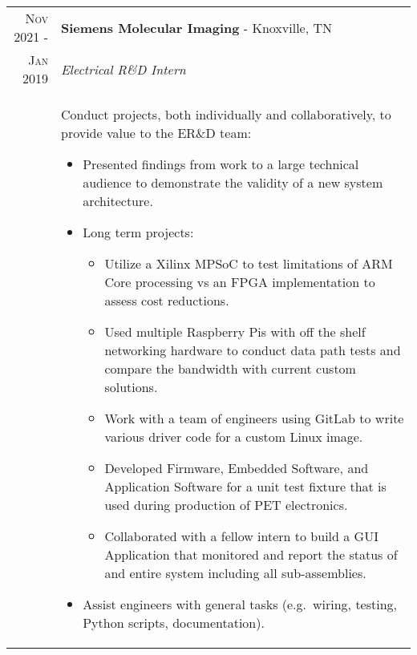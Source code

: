 \documentclass[a4paper,12pt]{article}
\begin{document}
%
%
\begin{tabularx}{\textwidth}{r|X}
   \textsc{Nov 2021 \--} & \textbf{Siemens Molecular Imaging} \-- Knoxville, TN\\
   \textsc{Jan 2019} & \emph{Electrical R\&D Intern}\\
   & \small{Conduct projects, both individually and collaboratively, to provide value to the ER\&D team:
      \begin{itemize}[leftmargin=20pt,topsep=1pt,itemsep=1pt,partopsep=0pt, parsep=1pt]
         \item Presented findings from work to a large technical audience to demonstrate the validity of a new system architecture.
         \item Long term projects:
            \begin{itemize}[leftmargin=20pt,topsep=1pt,itemsep=1pt,partopsep=0pt, parsep=1pt]
               \item Utilize a Xilinx MPSoC to test limitations of ARM Core processing vs an FPGA implementation to assess cost reductions.
               \item Used multiple Raspberry Pis with off the shelf networking hardware to conduct data path tests and compare the bandwidth with current custom solutions.
               \item Work with a team of engineers using GitLab to write various driver code for a custom Linux image.
               \item Developed Firmware, Embedded Software, and Application Software for a unit test fixture that is used during production of PET electronics.
               \item Collaborated with a fellow intern to build a GUI Application that monitored and report the status of and entire system including all sub-assemblies.
            \end{itemize}
         \item Assist engineers with general tasks (e.g.\ wiring, testing, Python scripts, documentation).
      \vspace{-0.5cm}
      \end{itemize}}\\
\end{tabularx}

\end{document}
